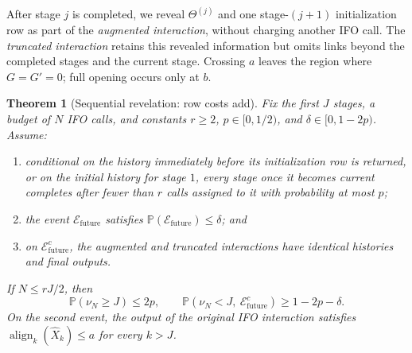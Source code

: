 \documentclass{article}
\newtheorem{theorem}{Theorem}[section]
\theoremstyle{definition}
\newcommand{\Prob}{\mathbb{P}}
\newcommand{\cEfuture}{\mathcal{E}_{\mathrm{future}}}
\newcommand{\proofguidespace}{\Needspace{10\baselineskip}}
\begin{document}
After stage $j$ is completed, we reveal $\Theta^{(j)}$ and one stage-$(j+1)$
initialization row as part of the \emph{augmented interaction}, without charging
another IFO call.  The \emph{truncated interaction} retains this revealed
information but omits links beyond the completed stages and the current stage.
Crossing $a$ leaves the region where
$G=G'=0$; full opening occurs only at $b$.

\proofguidespace
\begin{theorem}[Sequential revelation: row costs add]
\label{thm:sequential}
Fix the first $J$ stages, a budget of $N$ IFO calls, and constants
$r\ge2$, $p\in[0,1/2)$, and $\delta\in[0,1-2p)$.  Assume:
\begin{enumerate}[label=(S\arabic*),leftmargin=*,itemsep=1pt,topsep=2pt]
 \item conditional on the history immediately before its initialization row is
 returned, or on the initial history for stage $1$, every stage once it becomes current
 completes after fewer than $r$ calls assigned to it with probability at most $p$;
 \item the event $\cEfuture$ satisfies $\Prob(\cEfuture)\le\delta$; and
 \item on $\cEfuture^c$, the augmented and truncated interactions have identical
 histories and final outputs.
\end{enumerate}
If $N\le rJ/2$, then
\begin{equation}
 \Prob(\nu_N\ge J)\le2p,
 \qquad
 \Prob(\nu_N<J,\ \cEfuture^c)\ge1-2p-\delta.
 \label{eq:restated-sequential-conclusion}
\end{equation}
On the second event, the output of the original IFO interaction satisfies
$\operatorname{align}_k(\widehat X_k)\le a$ for every $k>J$.
\end{theorem}
\end{document}
